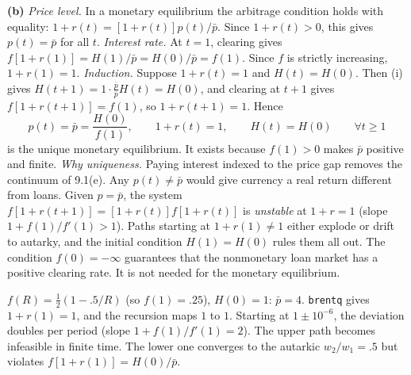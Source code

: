\documentclass[12pt, letterpaper]{article}
\begin{document}
\begin{tcolorbox}[evenbox,title={Exercise 9.12 \quad Grandmont--Hall}]
\textbf{(b)} \emph{Price level.} In a monetary equilibrium the arbitrage condition holds with
equality: $1+r(t)=[1+r(t)]p(t)/\bar p$. Since $1+r(t)>0$, this gives $\boxed{p(t)=\bar p}$ for all $t$.
\emph{Interest rate.} At $t=1$, clearing gives $f[1+r(1)]=H(1)/\bar p=H(0)/\bar p=f(1)$. Since $f$ is
strictly increasing, $1+r(1)=1$. \emph{Induction.} Suppose $1+r(t)=1$ and $H(t)=H(0)$. Then (i) gives
$H(t+1)=1\cdot\frac{\bar p}{\bar p}H(t)=H(0)$, and clearing at $t+1$ gives $f[1+r(t+1)]=f(1)$, so
$1+r(t+1)=1$. Hence
\[
\boxed{p(t)=\bar p=\frac{H(0)}{f(1)},\qquad 1+r(t)=1,\qquad H(t)=H(0)\qquad\forall t\ge1}
\]
is the unique monetary equilibrium. It exists because $f(1)>0$ makes $\bar p$ positive and finite.
\emph{Why uniqueness.} Paying interest indexed to the price gap removes the continuum of 9.1(e).
Any $p(t)\ne\bar p$ would give currency a real return different from loans. Given $p=\bar p$, the
system $f[1+r(t+1)]=[1+r(t)]f[1+r(t)]$ is \emph{unstable} at $1+r=1$ (slope $1+f(1)/f'(1)>1$). Paths
starting at $1+r(1)\ne1$ either explode or drift to autarky, and the initial condition $H(1)=H(0)$
rules them all out. The condition $f(0)=-\infty$ guarantees that the nonmonetary loan market has a
positive clearing rate. It is not needed for the monetary equilibrium.

\begin{tcolorbox}[databox]
$f(R)=\frac12(1-.5/R)$ (so $f(1)=.25$), $H(0)=1$: $\bar p=4$. \texttt{brentq} gives $1+r(1)=1$, and
the recursion maps $1$ to $1$. Starting at $1\pm10^{-6}$, the deviation doubles per period (slope
$1+f(1)/f'(1)=2$). The upper path becomes infeasible in finite time. The lower one converges to the
autarkic $w_2/w_1=.5$ but violates $f[1+r(1)]=H(0)/\bar p$.
\end{tcolorbox}
\end{tcolorbox}
\end{document}
